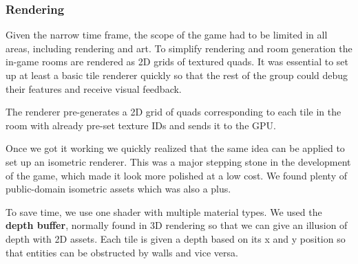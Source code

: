\documentclass{article}
\begin{document}
\subsubsection{Rendering}
Given the narrow time frame, the scope of the game had to be limited in all areas, including rendering and art. To simplify rendering and room generation the in-game rooms are rendered as 2D grids of textured quads. It was essential to set up at least a basic tile renderer quickly so that the rest of the group could debug their features and receive visual feedback. \par
The renderer pre-generates a 2D grid of quads corresponding to each tile in the room with already pre-set texture IDs and sends it to the GPU. \par
Once we got it working we quickly realized that the same idea can be applied to set up an isometric renderer. This was a major stepping stone in the development of the game, which made it look more polished at a low cost. We found plenty of public-domain isometric assets which was also a plus. \par
To save time, we use one shader with multiple material types. We used the \textbf{depth buffer}, normally found in 3D rendering so that we can give an illusion of depth with 2D assets. Each tile is given a depth based on its x and y position so that entities can be obstructed by walls and vice versa.
\end{document}
